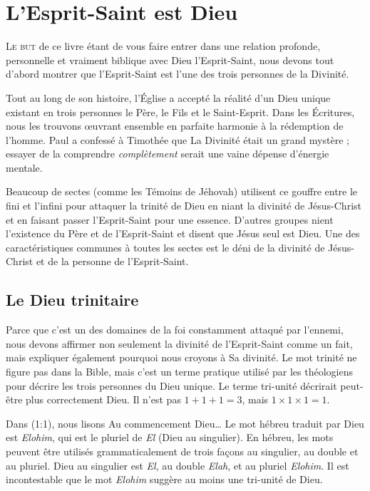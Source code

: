 \chapter{L'Esprit-Saint est Dieu}

\lettrine{L}{e but} de ce livre étant de vous faire entrer
 dans une relation profonde, personnelle et vraiment biblique avec
 Dieu l'Esprit-Saint, nous devons tout d'abord montrer que l'Esprit-Saint
 est l'une des trois personnes de la Divinité.

Tout au long de son histoire, l'Église a accepté la réalité d'un Dieu unique
 existant en trois personnes\frcolon{} le Père, le Fils et le Saint-Esprit.
 Dans les Écritures, nous les trouvons \oe{}uvrant ensemble en parfaite harmonie
 à la rédemption de l'homme.
 Paul a confessé à Timothée que La Divinité était un grand mystère ;
 essayer de la comprendre \emph{complètement} serait une vaine dépense
 d'énergie mentale.

Beaucoup de sectes (comme les Témoins de Jéhovah) utilisent
 ce gouffre entre le fini et l'infini pour attaquer la trinité de Dieu
 en niant la divinité de Jésus-Christ et en faisant passer l'Esprit-Saint
 pour une essence. D'autres groupes nient l'existence du Père et
 de l'Esprit-Saint et disent que Jésus seul est Dieu.
 Une des caractéristiques communes à toutes les sectes est le déni de la divinité
 de Jésus-Christ et de la personne de l'Esprit-Saint.

\section{Le Dieu trinitaire}

Parce que c'est un des domaines de la foi constamment attaqué par l'ennemi, nous devons
 affirmer non seulement la divinité de l'Esprit-Saint comme un fait,
 mais expliquer également pourquoi nous croyons à Sa divinité.
 Le mot \Og trinité \Fg{} ne figure pas dans la Bible, mais c'est un
 terme pratique utilisé par les théologiens pour décrire les trois personnes
 du Dieu unique.
 Le terme \Og tri-unité \Fg{} décrirait peut-être plus correctement Dieu.
 Il n'est pas $1 + 1 + 1 = 3$, mais $1 \times 1 \times 1 = 1$.

Dans (1:1), nous lisons\frcolon{}
 \Og Au commencement Dieu\dots{} \Fg{}
 Le mot hébreu traduit par \Og Dieu \Fg{} est \emph{Elohim}, qui est
 le pluriel de \emph{El} (Dieu au singulier).
 En hébreu, les mots peuvent être utilisés grammaticalement de trois
 façons\frcolon{} au singulier, au \Og double \Fg{} et au pluriel.
 \Og Dieu \Fg{} au singulier est \emph{El}, au double \emph{Elah},
 et au pluriel \emph{Elohim}.
 Il est incontestable que le mot \emph{Elohim} suggère au moins
 une tri-unité de Dieu.

